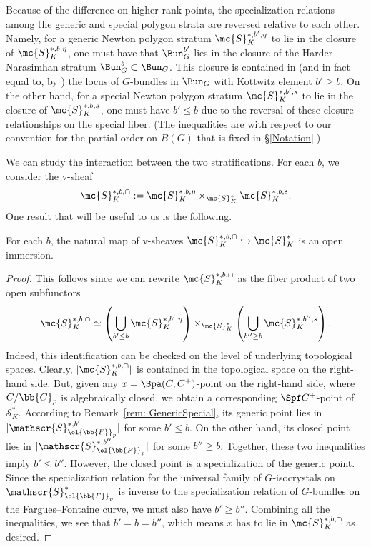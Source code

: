 \documentclass[letterpaper,11pt]{amsart}
\begin{document}
\begin{remark}
    Because of the difference on higher rank points, the specialization relations among the generic and special polygon strata are reversed relative to each other. Namely, for a generic Newton polygon stratum $\mc{S}^{\ast,b',\eta}_K$ to lie in the closure of $\mc{S}^{\ast,b,\eta}_K$, one must have that $\Bun_G^{b'}$ lies in the closure of the Harder--Narasimhan stratum $\Bun_{G}^{b} \subset \Bun_{G}$. This closure is contained in (and in fact equal to, by \cite[Theorem~1.1]{Vi}) the locus of $G$-bundles in $\Bun_{G}$ with Kottwitz element $b' \geq b$. On the other hand, for a special Newton polygon stratum $\mc{S}^{\ast,b',s}_K$ to lie in the closure of $\mc{S}^{\ast,b,s}_K$, one must have $b' \leq b$ due to the reversal of these closure relationships on the special fiber. (The inequalities are with respect to our convention for the partial order on $B(G)$ that is fixed in \S\ref{Notation}.)
\end{remark}
We can study the interaction between the two stratifications. For each $b$, we consider the v-sheaf 
\[\mc{S}^{\ast,b,\cap}_K:=\mc{S}^{\ast,b,\eta}_K\times_{\mc{S}^{\ast}_K} \mc{S}^{\ast,b,s}_K.\] 
One result that will be useful to us is the following.
\begin{lemma}\label{lem: CapStrataOpen}
    For each $b$, the natural map of v-sheaves $\mc{S}^{\ast,b,\cap}_K\hookrightarrow \mc{S}^{\ast}_K$
    is an open immersion. 
\end{lemma}
\begin{proof}
    This follows since we can rewrite $\mc{S}^{\ast,b,\cap}_K$ as the fiber product of two open subfunctors
    \[\mc{S}^{\ast,b,\cap}_K\simeq \left(\bigcup_{b'\leq b}
    \mc{S}^{\ast,b',\eta}_K\right)\times_{\mc{S}^{\ast}_K} \left(\bigcup_{b''\geq b}\mc{S}^{\ast,b'',s}_K\right).\]
 Indeed, this identification can be checked on the level of underlying topological spaces. Clearly, $|\mc{S}^{\ast,b, \cap}_K|$ is contained in the topological space on the right-hand side. But, given any $x=\Spa(C,C^+)$-point on the right-hand side, where $C/\bb{C}_p$ is algebraically closed, we obtain a corresponding $\Spf C^+$-point of $\mathscr{S}^\ast_K$. According to Remark~\ref{rem: GenericSpecial}, its generic point lies in $|\mathscr{S}^{\ast,b'}_{\ol{\bb{F}}_p}|$ for some $b'\leq b$. On the other hand, its closed point lies in $|\mathscr{S}^{\ast,b''}_{\ol{\bb{F}}_p}|$ for some $b''\geq b$. Together, these two inequalities imply $b'\leq b''$. However, the closed point is a specialization of the generic point. Since the specialization relation for the universal family of $G$-isocrystals on $\mathscr{S}^\ast_{\ol{\bb{F}}_p}$ is inverse to the specialization relation of $G$-bundles on the Fargues--Fontaine curve, we must also have $b'\geq b''$. Combining all the inequalities, we see that $b'=b=b''$, which means $x$ has to lie in $\mc{S}^{\ast,b,\cap}_K$ as desired.
\end{proof}
\end{document}
